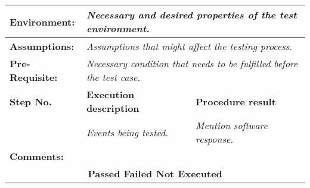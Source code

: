 \documentclass{FastFyp}
\begin{document}
\begin{table}[!ht]
\begin{tabular}{|llll|}
\multicolumn{1}{|l|}{\textbf{Environment:}} &
  \multicolumn{3}{l|}{\textit{Necessary and desired properties of the test environment.}} \\ \hline
\multicolumn{1}{|l|}{\textbf{Assumptions:}} &
  \multicolumn{3}{l|}{\textit{Assumptions that might affect the testing process.}} \\ \hline
\multicolumn{1}{|l|}{\textbf{Pre-Requisite:}} &
  \multicolumn{3}{l|}{\textit{Necessary condition that  needs to be fulfilled before the test case.}} \\ \hline
\multicolumn{1}{|l|}{\textbf{Step No.}} &
  \multicolumn{1}{l|}{\textbf{Execution   description}} &
  \multicolumn{2}{l|}{\textbf{Procedure result}} \\ \hline
\multicolumn{1}{|l|}{} &
  \multicolumn{1}{l|}{\textit{Events being tested.}} &
  \multicolumn{2}{l|}{\textit{Mention software response.}} \\ \hline
\multicolumn{4}{|l|}{\textbf{Comments:}} \\ \hline
\multicolumn{4}{|c|}{\textbf{Passed      Failed     Not Executed}} \\ \hline
\end{tabular}
\label{tab:3}
\end{table}
\end{document}
